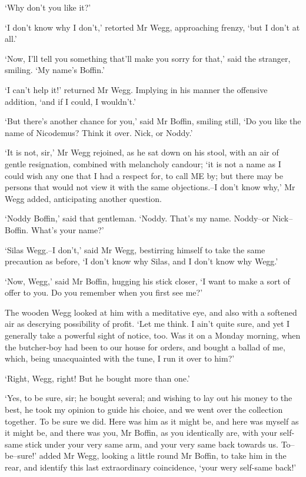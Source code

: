 ‘Why don’t you like it?’

‘I don’t know why I don’t,’ retorted Mr Wegg, approaching frenzy, ‘but I
don’t at all.’

‘Now, I’ll tell you something that’ll make you sorry for that,’ said the
stranger, smiling. ‘My name’s Boffin.’

‘I can’t help it!’ returned Mr Wegg. Implying in his manner the
offensive addition, ‘and if I could, I wouldn’t.’

‘But there’s another chance for you,’ said Mr Boffin, smiling still, ‘Do
you like the name of Nicodemus? Think it over. Nick, or Noddy.’

‘It is not, sir,’ Mr Wegg rejoined, as he sat down on his stool, with an
air of gentle resignation, combined with melancholy candour; ‘it is not
a name as I could wish any one that I had a respect for, to call ME
by; but there may be persons that would not view it with the same
objections.--I don’t know why,’ Mr Wegg added, anticipating another
question.

‘Noddy Boffin,’ said that gentleman. ‘Noddy. That’s my name. Noddy--or
Nick--Boffin. What’s your name?’

‘Silas Wegg.--I don’t,’ said Mr Wegg, bestirring himself to take the
same precaution as before, ‘I don’t know why Silas, and I don’t know why
Wegg.’

‘Now, Wegg,’ said Mr Boffin, hugging his stick closer, ‘I want to make a
sort of offer to you. Do you remember when you first see me?’

The wooden Wegg looked at him with a meditative eye, and also with a
softened air as descrying possibility of profit. ‘Let me think. I ain’t
quite sure, and yet I generally take a powerful sight of notice, too.
Was it on a Monday morning, when the butcher-boy had been to our house
for orders, and bought a ballad of me, which, being unacquainted with
the tune, I run it over to him?’

‘Right, Wegg, right! But he bought more than one.’

‘Yes, to be sure, sir; he bought several; and wishing to lay out his
money to the best, he took my opinion to guide his choice, and we went
over the collection together. To be sure we did. Here was him as it
might be, and here was myself as it might be, and there was you, Mr
Boffin, as you identically are, with your self-same stick under your
very same arm, and your very same back towards us. To--be--sure!’ added
Mr Wegg, looking a little round Mr Boffin, to take him in the rear,
and identify this last extraordinary coincidence, ‘your wery self-same
back!’

